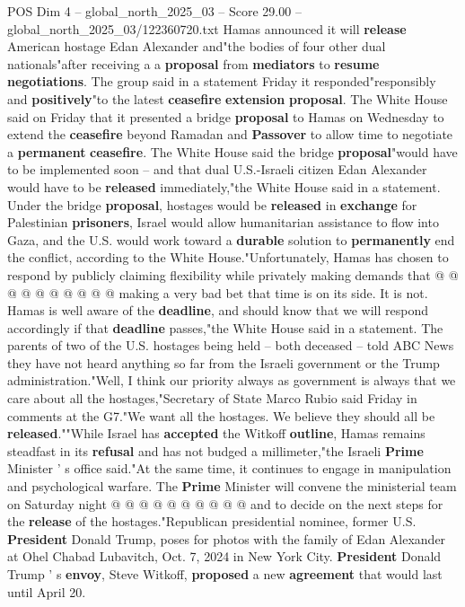 \begin{textsample}{POS Dim 4 – global\_north\_2025\_03 – Score 29.00 – global\_north\_2025\_03/122360720.txt}  \label{ex:f4_pos_068}
Hamas announced it will \textbf{release} American hostage Edan Alexander and"the bodies of four other dual nationals"after receiving a a \textbf{proposal} from \textbf{mediators} to \textbf{resume} \textbf{negotiations}.
The group said in a statement Friday it responded"responsibly and \textbf{positively}"to the latest \textbf{ceasefire} \textbf{extension} \textbf{proposal}.
The White House said on Friday that it presented a bridge \textbf{proposal} to Hamas on Wednesday to extend the \textbf{ceasefire} beyond Ramadan and \textbf{Passover} to allow time to negotiate a \textbf{permanent} \textbf{ceasefire}.
The White House said the bridge \textbf{proposal}"would have to be implemented soon -- and that dual U.S.-Israeli citizen Edan Alexander would have to be \textbf{released} immediately,"the White House said in a statement.
Under the bridge \textbf{proposal}, hostages would be \textbf{released} in \textbf{exchange} for Palestinian \textbf{prisoners}, Israel would allow humanitarian assistance to flow into Gaza, and the U.S. would work toward a \textbf{durable} solution to \textbf{permanently} end the conflict, according to the White House."Unfortunately, Hamas has chosen to respond by publicly claiming flexibility while privately making demands that @ @ @ @ @ @ @ @ @ @ making a very bad bet that time is on its side.
It is not.
Hamas is well aware of the \textbf{deadline}, and should know that we will respond accordingly if that \textbf{deadline} passes,"the White House said in a statement.
The parents of two of the U.S. hostages being held -- both deceased -- told ABC News they have not heard anything so far from the Israeli government or the Trump administration."Well, I think our priority always as government is always that we care about all the hostages,"Secretary of State Marco Rubio said Friday in comments at the G7."We want all the hostages.
We believe they should all be \textbf{released}.""While Israel has \textbf{accepted} the Witkoff \textbf{outline}, Hamas remains steadfast in its \textbf{refusal} and has not budged a millimeter,"the Israeli \textbf{Prime} Minister ' s office said."At the same time, it continues to engage in manipulation and psychological warfare.
The \textbf{Prime} Minister will convene the ministerial team on Saturday night @ @ @ @ @ @ @ @ @ @ and to decide on the next steps for the \textbf{release} of the hostages."Republican presidential nominee, former U.S. \textbf{President} Donald Trump, poses for photos with the family of Edan Alexander at Ohel Chabad Lubavitch, Oct. 7, 2024 in New York City. \textbf{President} Donald Trump ' s \textbf{envoy}, Steve Witkoff, \textbf{proposed} a new \textbf{agreement} that would last until April 20.

\end{textsample}
